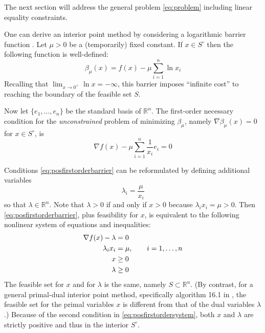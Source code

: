 \documentclass[11pt]{article}
\newcommand{\RR}{\mathbb{R}}
\newcommand{\grad}{\nabla}
\begin{document}
The next section will address the general problem \eqref{eq:problem} including linear equality constraints.

One can derive an interior point method by considering a logarithmic barrier function \cite[section 16.2]{GrivaNashSofer2009}.  Let $\mu>0$ be a (temporarily) fixed constant.  If $x\in S^\circ$ then the following function is well-defined:
\begin{equation}
\beta_\mu(x) = f(x) - \mu \sum_{i=1}^n \ln x_i \label{eq:posbarrierfunction}
\end{equation}
Recalling that $\lim_{x\to 0^+} \ln x = -\infty$, this barrier imposes ``infinite cost'' to reaching the boundary of the feasible set $S$.

Now let $\{e_1,\dots,e_n\}$ be the standard basis of $\RR^n$.  The first-order necessary condition for the \emph{unconstrained} problem of minimizing $\beta_\mu$, namely $\grad \beta_\mu(x)=0$ for $x \in S^\circ$, is
\begin{equation}
\grad f(x) - \mu \sum_{i=1}^n \frac{1}{x_i} e_i = 0 \label{eq:posfirstorderbarrier}
\end{equation}

Conditions \eqref{eq:posfirstorderbarrier} can be reformulated by defining additional variables
    $$\lambda_i = \frac{\mu}{x_i}$$
so that $\lambda\in\RR^n$.  Note that $\lambda>0$ if and only if $x>0$ because $\lambda_i x_i = \mu > 0$.  Then \eqref{eq:posfirstorderbarrier}, plus feasibility for $x$, is equivalent to the following nonlinear system of equations and inequalities:
\begin{align}
\grad f(x) - \lambda &= 0 \label{eq:posfirstordersystem} \\
\lambda_i x_i &= \mu, \qquad i=1,\dots,n \notag \\
x &\ge 0 \notag \\
\lambda &\ge 0 \notag
\end{align}
The feasible set for $x$ and for $\lambda$ is the same, namely $S \subset \RR^n$.   (By contrast, for a general primal-dual interior point method, specifically algorithm 16.1 in \cite[section 16.7]{GrivaNashSofer2009}, the feasible set for the primal variables $x$ is different from that of the dual variables $\lambda$.)  Because of the second condition in \eqref{eq:posfirstordersystem}, both $x$ and $\lambda$ are strictly positive and thus in the interior $S^\circ$.
\end{document}
